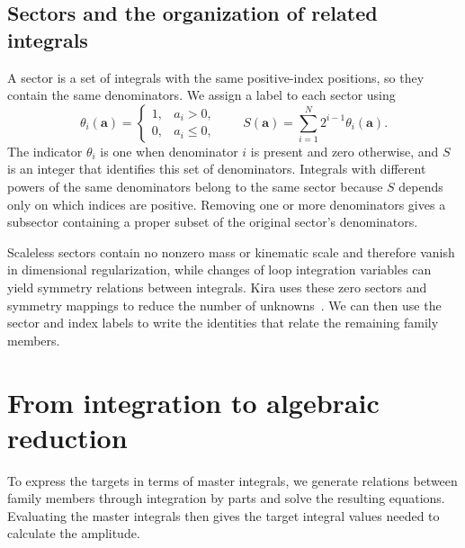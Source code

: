 \subsection{Sectors and the organization of related integrals}
A sector is a set of integrals with the same positive-index positions,
so they contain the same denominators. We assign a label to each sector
using
\begin{equation}
 \theta_i(\boldsymbol a)=
 \begin{cases}1,&a_i>0,\\0,&a_i\leq0,\end{cases}
 \qquad
 S(\boldsymbol a)=\sum_{i=1}^{N}2^{i-1}\theta_i(\boldsymbol a).
 \label{eq:sector}
\end{equation}
The indicator $\theta_i$ is one when denominator $i$ is present and zero
otherwise, and $S$ is an integer that identifies this set of denominators.
Integrals with different powers of the same denominators belong to the
same sector because $S$ depends only on which indices are positive.
Removing one or more denominators gives a subsector containing a proper
subset of the original sector's denominators.

Scaleless sectors contain no nonzero mass or kinematic scale and therefore
vanish in dimensional regularization, while changes of loop integration
variables can yield symmetry relations between integrals. Kira uses these
zero sectors and symmetry mappings to reduce the number of
unknowns~\cite{KiraOriginal}. We can then use the sector and index labels
to write the identities that relate the remaining family members.

\section{From integration to algebraic reduction}
\label{sec:ibp-reduction}
To express the targets in terms of master integrals, we generate
relations between family members through integration by parts and solve
the resulting equations. Evaluating the master integrals then gives
the target integral values needed to calculate the amplitude.


